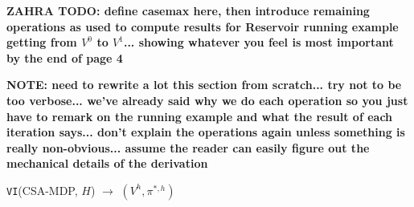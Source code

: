 {\bf ZAHRA TODO: define casemax here, then introduce remaining operations as used
to compute results for Reservoir running example getting from $V^0$ to $V^1$... showing
whatever you feel is most important by the end of page 4}

{\bf NOTE: need to rewrite a lot this section from scratch... try not to be too
verbose... we've already said why we do each operation so you just
have to remark on the running example and what the result of each
iteration says... don't explain the operations again unless something
is really non-obvious... assume the reader can easily figure out the
mechanical details of the derivation}

\incmargin{.5em}
\linesnumbered
\begin{algorithm}[t!]
\vspace{-.5mm}
\dontprintsemicolon
{}
\caption{\footnotesize \texttt{VI}(CSA-MDP, $H$) $\longrightarrow$ $(V^h,\pi^{*,h})$ \label{alg:vi}}
\vspace{-1mm}
\end{algorithm}
\decmargin{.5em}

